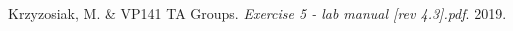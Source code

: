 \documentclass[a4paper,12pt]{article}
\begin{document}

\begin{thebibliography}{9}
 Krzyzosiak, M. \& VP141 TA Groups.
\textit{Exercise 5 - lab manual [rev 4.3].pdf}. 
2019.
\end{thebibliography}


\end{document}

